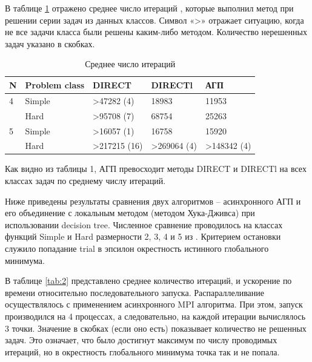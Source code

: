 \documentclass{svproc}
\begin{document}
В таблице \ref{tab:1} отражено среднее число итераций , которые выполнил метод при решении серии задач из данных классов. Символ «>» отражает ситуацию, когда не все задачи класса были решены каким-либо методом. Количество нерешенных задач указано в скобках.


\begin{table}[!ht]
    \caption{Среднее число итераций}
    \label{tab:1}
    \centering
    \begin{tabular}{|l|l|l|l|l|}
    \hline
        N & Problem class & DIRECT & DIRECTl & АГП  \\ \hline
        4 & Simple & >47282 (4) & 18983 & 11953  \\ \hline
        ~ & Hard & >95708 (7) & 68754 & 25263  \\ \hline
        5 & Simple & >16057 (1) & 16758 & 15920  \\ \hline
        ~ & Hard & >217215 (16) & >269064 (4) & >148342 (4)  \\ \hline
    \end{tabular}
\end{table}

Как видно из таблицы 1, АГП превосходит методы DIRECT и DIRECTl на всех классах задач по среднему числу итераций. 


Ниже приведены результаты сравнения двух алгоритмов – асинхронного АГП и его объединение с локальным методом (методом Хука-Дживса) при использовании decision tree. Численное сравнение проводилось на классах функций Simple и Hard размерности 2, 3, 4 и 5 из \cite{fio_bib19}. Критерием остановки служило попадание trial в эпсилон окрестность истинного глобального минимума. 

В таблице \ref{tab:2} представлено среднее количество итераций, и ускорение по времени относительно последовательного запуска. Распараллеливание  осуществлялось с применением асинхронного MPI алгоритма. При этом, запуск производился на 4 процессах, а следовательно, на каждой итерации вычислялось 3 точки. Значение в скобках (если оно есть) показывает количество не решенных задач. Это означает, что было достигнут максимум по числу проводимых итераций, но в окрестность глобального минимума точка так и не попала.
\end{document}
